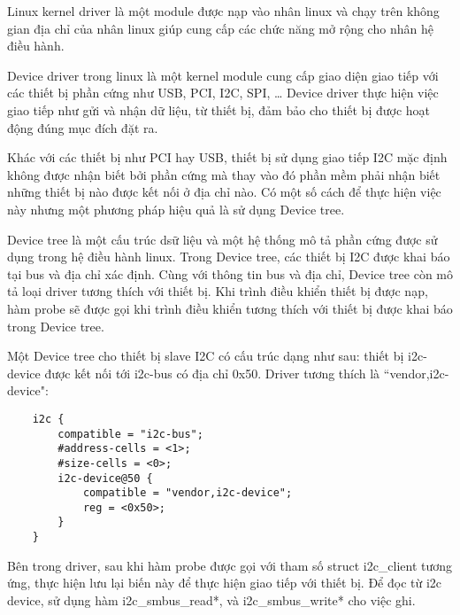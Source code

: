 
Linux kernel driver là một module được nạp vào nhân linux và chạy trên không gian địa chỉ của nhân linux giúp cung cấp các chức năng mở rộng cho nhân hệ điều hành.

Device driver trong linux là một kernel module cung cấp giao diện giao tiếp với các thiết bị phần cứng như USB, PCI, I2C, SPI, … Device driver thực hiện việc giao tiếp như gửi và nhận dữ liệu, từ thiết bị, đảm bảo cho thiết bị được hoạt động đúng mục đích đặt ra.

Khác với các thiết bị như PCI hay USB, thiết bị sử dụng giao tiếp I2C mặc định không được nhận biết bởi phần cứng mà thay vào đó phần mềm phải nhận biết những thiết bị nào được kết nối ở địa chỉ nào. Có một số cách để thực hiện việc này nhưng một phương pháp hiệu quả là sử dụng Device tree.

Device tree là một cấu trúc dsữ liệu và một hệ thống mô tả phần cứng được sử dụng trong hệ điều hành linux. Trong Device tree, các thiết bị I2C được khai báo tại bus và địa chỉ xác định. Cùng với thông tin bus và địa chỉ, Device tree còn mô tả loại driver tương thích với thiết bị. Khi trình điều khiển thiết bị được nạp, hàm probe sẽ được gọi khi trình điều khiển tương thích với thiết bị được khai báo trong Device tree.

Một Device tree cho thiết bị slave I2C có cấu trúc dạng như sau: thiết bị i2c-device được kết nối tới i2c-bus có địa chỉ 0x50. Driver tương thích là “vendor,i2c-device":
\begin{lstlisting}
	i2c {
		compatible = "i2c-bus";
		#address-cells = <1>;
		#size-cells = <0>;
		i2c-device@50 {
			compatible = "vendor,i2c-device";
			reg = <0x50>;
		}
	}
\end{lstlisting}

Bên trong driver, sau khi hàm probe được gọi với tham số struct i2c\_client tương ứng, thực hiện lưu lại biến này để thực hiện giao tiếp với thiết bị. Để đọc từ i2c device, sử dụng hàm i2c\_smbus\_read*, và i2c\_smbus\_write* cho việc ghi.

